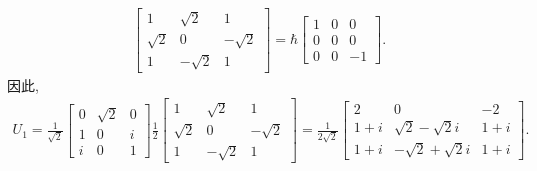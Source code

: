 \documentclass{assignment}
\begin{document}
\begin{pf}
\begin{align}
\begin{bmatrix}
            1&\sqrt{2}&1\\
            \sqrt{2}&0&-\sqrt{2}\\
            1&-\sqrt{2}&1
        \end{bmatrix}=\hbar\begin{bmatrix}
            1&0&0\\
            0&0&0\\
            0&0&-1
        \end{bmatrix}.
    \end{align}
    因此,
    \begin{align}
        U_1=\frac{1}{\sqrt{2}}\begin{bmatrix}
            0&\sqrt{2}&0\\
            1&0&i\\
            i&0&1
        \end{bmatrix}\frac{1}{2}\begin{bmatrix}
            1&\sqrt{2}&1\\
            \sqrt{2}&0&-\sqrt{2}\\
            1&-\sqrt{2}&1
        \end{bmatrix}=\frac{1}{2\sqrt{2}}\begin{bmatrix}
            2&0&-2\\
            1+i&\sqrt{2}-\sqrt{2}i&1+i\\
            1+i&-\sqrt{2}+\sqrt{2}i&1+i
        \end{bmatrix}.
    \end{align}


\end{pf}
\end{document}
